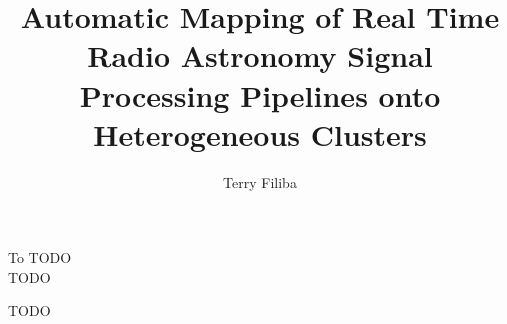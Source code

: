\documentclass{ucbthesis}
\begin{document}

\title{Automatic Mapping of Real Time Radio Astronomy Signal Processing Pipelines onto Heterogeneous Clusters}
\author{Terry Filiba}




\maketitle
\approvalpage
\copyrightpage



\begin{frontmatter}

\begin{dedication}
\null\vfil
\begin{center}
To TODO\\\vspace{12pt}
TODO
\end{center}
\vfil\null
\end{dedication}

\tableofcontents
\clearpage
\listoffigures
\clearpage
\listoftables

\begin{acknowledgements}
TODO
\end{acknowledgements}

\end{frontmatter}

\pagestyle{headings}


 
 
 
 
 
 
 



\printbibliography
\end{document}
